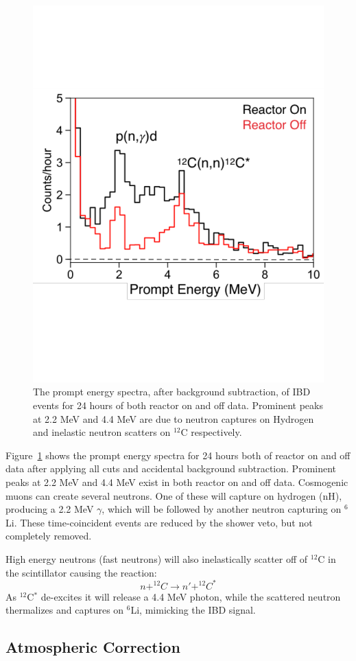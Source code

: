 \begin{figure}[!b]
	\centering
	\includegraphics[width=0.6\linewidth]{tex/7-oscillation-images/IBD_E}
	\caption{The prompt energy spectra, after background subtraction, of IBD events for 24 hours of both reactor on and off data. Prominent peaks at 2.2 MeV and 4.4 MeV are due to neutron captures on Hydrogen and inelastic neutron scatters on $^{12}$C respectively.}
	\label{fig:ibde}
\end{figure}

Figure~\ref{fig:ibde} shows the prompt energy spectra for 24 hours both of reactor on and off data after applying all cuts and accidental background subtraction.
Prominent peaks at 2.2 MeV and 4.4 MeV exist in both reactor on and off data.
Cosmogenic muons can create several neutrons. One of these will capture on hydrogen (nH), producing a 2.2 MeV $\gamma$, which will be followed by another neutron capturing on $^6$Li. 
These time-coincident events are reduced by the shower veto, but not completely removed.

High energy neutrons (fast neutrons) will also inelastically scatter off of $^{12}$C in the scintillator causing the reaction:
\begin{equation}
	n + ^{12}C \rightarrow n' + ^{12}C^*
\end{equation}
As $^{12}$C$^*$ de-excites it will release a 4.4 MeV photon, while the scattered neutron thermalizes and captures on $^{6}$Li, mimicking the IBD signal.


\subsection{Atmospheric Correction}

